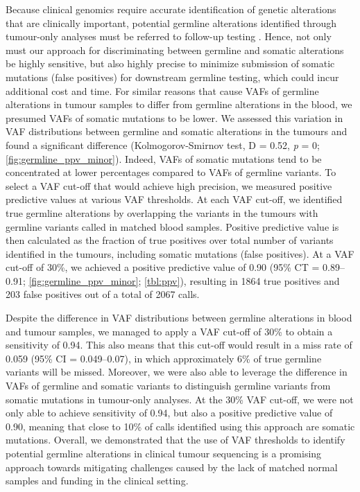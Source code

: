 Because clinical genomics require accurate identification of genetic alterations that are clinically important, potential germline alterations identified through tumour-only analyses must be referred to follow-up testing \cite{Raymond2016, Bombard2014, Green2013}. Hence, not only must our approach for discriminating between germline and somatic alterations be highly sensitive, but also highly precise to minimize submission of somatic mutations (false positives) for downstream germline testing, which could incur additional cost and time. For similar reasons that cause VAFs of germline alterations in tumour samples to differ from germline alterations in the blood, we presumed VAFs of somatic mutations to be lower. We assessed this variation in VAF distributions between germline and somatic alterations in the tumours and found a significant difference (Kolmogorov-Smirnov test, D = 0.52, \textit{p} = 0; \autoref{fig:germline_ppv_minor}). Indeed, VAFs of somatic mutations tend to be concentrated at lower percentages compared to VAFs of germline variants. To select a VAF cut-off that would achieve high precision, we measured positive predictive values at various VAF thresholds. At each VAF cut-off, we identified true germline alterations by overlapping the variants in the tumours with germline variants called in matched blood samples. Positive predictive value is then calculated as the fraction of true positives over total number of variants identified in the tumours, including somatic mutations (false positives). At a VAF cut-off of 30\%, we achieved a positive predictive value of 0.90 (95\% CT = 0.89--0.91; \autoref{fig:germline_ppv_minor}; \autoref{tbl:ppv}), resulting in 1864 true positives and 203 false positives out of a total of 2067 calls.

Despite the difference in VAF distributions between germline alterations in blood and tumour samples, we managed to apply a VAF cut-off of 30\% to obtain a sensitivity of 0.94. This also means that this cut-off would result in a miss rate of 0.059 (95\% CI = 0.049--0.07), in which approximately 6\% of true germline variants will be missed. Moreover, we were also able to leverage the difference in VAFs of germline and somatic variants to distinguish germline variants from somatic mutations in tumour-only analyses. At the 30\% VAF cut-off, we were not only able to achieve sensitivity of 0.94, but also a positive predictive value of 0.90, meaning that close to 10\% of calls identified using this approach are somatic mutations. Overall, we demonstrated that the use of VAF thresholds to identify potential germline alterations in clinical tumour sequencing is a promising approach towards mitigating challenges caused by the lack of matched normal samples and funding in the clinical setting.

